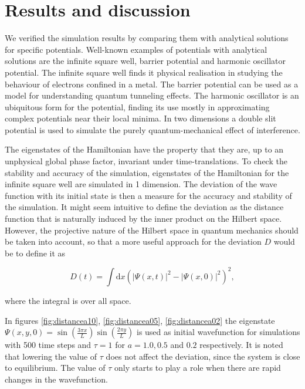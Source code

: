 \section*{Results and discussion}
We verified the simulation results by comparing them with analytical solutions for specific potentials. Well-known examples of potentials with analytical solutions are the infinite square well, barrier potential and harmonic oscillator potential.
The infinite square well finds it physical realisation in studying the behaviour of electrons confined in a metal. The barrier potential can be used as a model for understanding quantum tunneling effects. The harmonic oscillator is an ubiquitous form for the potential, finding its use mostly in approximating complex potentials near their local minima.
In two dimensions a double slit potential is used to simulate the purely quantum-mechanical effect of interference.


The eigenstates of the Hamiltonian have the property that they are, up to an unphysical global phase factor, invariant under time-translations. To check the stability and accuracy of the simulation, eigenstates of the Hamiltonian for the infinite square well are simulated in 1 dimension. The deviation of the wave function with its initial state is then a measure for the accuracy and stability of the simulation. It might seem intuitive to define the deviation as the distance function that is naturally induced by the inner product on the Hilbert space. However, the projective nature of the Hilbert space in quantum mechanics should be taken into account, so that a more useful approach for the deviation $D$ would be to define it as

\[
D(t) = \int\mathrm{d}x\left(|\Psi(x,t)|^2-|\Psi(x,0)|^2\right)^2,
\]

where the integral is over all space. 

In figures \ref{fig:distancea10}, \ref{fig:distancea05}, \ref{fig:distancea02} the eigenstate $\Psi(x,y,0) = \sin(\frac{3 \pi x}{L})\sin(\frac{2 \pi y}{L})$ is used as initial wavefunction for simulations with 500 time steps and $\tau = 1$ for $a = 1.0, 0.5$ and $0.2$ respectively. It is noted that lowering the value of $\tau$ does not affect the deviation, since the system is close to equilibrium. The value of $\tau$ only starts to play a role when there are rapid changes in the wavefunction.

